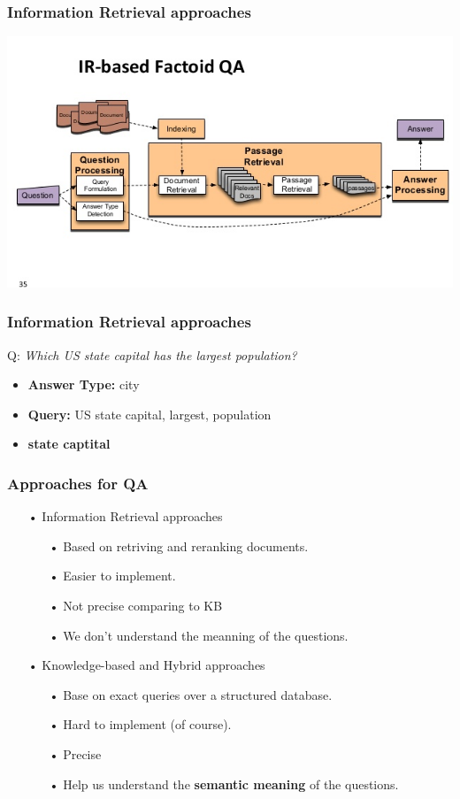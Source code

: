 \documentclass{beamer}
\begin{document}
\begin{frame} 
	\frametitle{Information Retrieval approaches} 
	\begin{center} 
		\centering 
			\includegraphics[width=\textwidth,height=\textheight,keepaspectratio]{irbase} 			
			\vspace{0.5cm} 
	\end{center} 
\end{frame} 

\begin{frame} 
	\frametitle{Information Retrieval approaches} 
	Q: \textit{Which US state capital has the largest population?} 
	\begin{itemize} 
		\item \textbf{Answer Type:} city 
		\item \textbf{Query:} US state capital, largest, population 
		\item \textbf{state captital} 
	\end{itemize} 
\end{frame} 


\begin{frame}
	\frametitle{Approaches for QA}		

			
	\begin{itemize}
		\item[•] Information Retrieval approaches
			\begin{itemize}
			    \item[•] Based on retriving and reranking documents.
				\item[•] Easier to implement.
				\item[•] Not precise comparing to KB
				\item[•] We don't understand the meanning of the questions.
			\end{itemize}
		
		\item[•] Knowledge-based and Hybrid approaches
			\begin{itemize}
			\item[•] Base on exact queries over a structured database.
			\item[•] Hard to implement (of course).
			\item[•] Precise
			\item[•] Help us understand the \textbf{semantic meaning} of the questions. 
			\end{itemize}
	\end{itemize}		
		
			
\end{frame}
\end{document}

